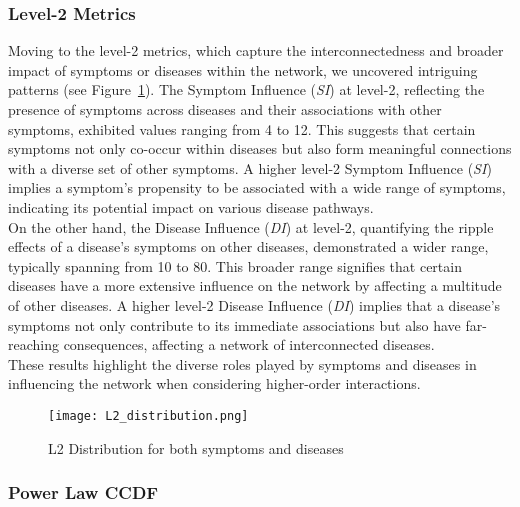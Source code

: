 \subsubsection*{Level-2 Metrics}
\label{subsubsec:level_2_metrics}
Moving to the level-2 metrics, which capture the interconnectedness and broader impact of symptoms or diseases within the network,
we uncovered intriguing patterns (see Figure~\ref{fig:l2_distribution}).
The Symptom Influence (\textit{SI}) at level-2, reflecting the presence of symptoms across diseases and their associations with other symptoms,
exhibited values ranging from 4 to 12.
This suggests that certain symptoms not only co-occur within diseases but also form meaningful connections with a diverse set of other symptoms.
A higher level-2 Symptom Influence (\textit{SI}) implies a symptom's propensity to be associated with a wide range of symptoms,
indicating its potential impact on various disease pathways.\\
On the other hand, the Disease Influence (\textit{DI}) at level-2, quantifying the ripple effects of a disease's symptoms on other diseases,
demonstrated a wider range, typically spanning from 10 to 80.
This broader range signifies that certain diseases have a more extensive influence on the network by affecting a multitude of other diseases.
A higher level-2 Disease Influence (\textit{DI}) implies that a disease's symptoms not only contribute to its immediate associations
but also have far-reaching consequences, affecting a network of interconnected diseases.\\
These results highlight the diverse roles played by symptoms and diseases in influencing the network when considering higher-order interactions.


\begin{figure}[H]
    \centering
    \texttt{[image: L2\_distribution.png]}
    \caption{L2 Distribution for both symptoms and diseases}\label{fig:l2_distribution}
\end{figure}
\subsubsection*{Power Law CCDF}
\label{subsubsec:power_law_ccdf}


